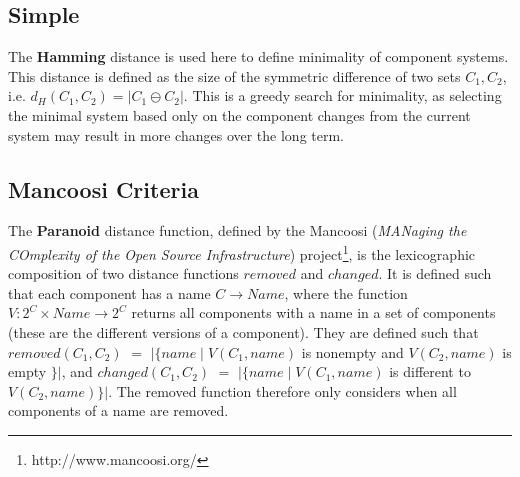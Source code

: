 

\subsection{Simple}
The \textbf{Hamming} distance \cite{hamming1950error} is used here to define minimality of component systems.
This distance is defined as the size of the symmetric difference of two sets $C_1,C_2$, 
i.e. $d_H(C_1,C_2) = |C_1 \ominus C_2|$.
This is a greedy search for minimality, 
as selecting the minimal system based only on the component changes from the current system may result in more changes over the long term.


\subsection{Mancoosi Criteria}






The \textbf{Paranoid} distance function, 
defined by the Mancoosi (\textit{MANaging the COmplexity of the Open Source Infrastructure}) project\footnote{http://www.mancoosi.org/}, 
is the lexicographic composition of two distance functions $removed$ and $changed$.
It is defined such that each component has a name $C \rightarrow Name$,
where the function $V: 2^C \times Name \rightarrow 2^C$ returns all components with a name in a set of components 
(these are the different versions of a component).
They are defined such that $removed(C_1,C_2)$ $=$ $|\{name \mid V(C_1,name) $ is nonempty and $V(C_2,name)$ is empty $\}|$,
and $changed(C_1,C_2)$ $=$ $|\{name \mid V(C_1,name)$ is different to $V(C_2,name)\}|$.
The removed function therefore only considers when all components of a name are removed. 

